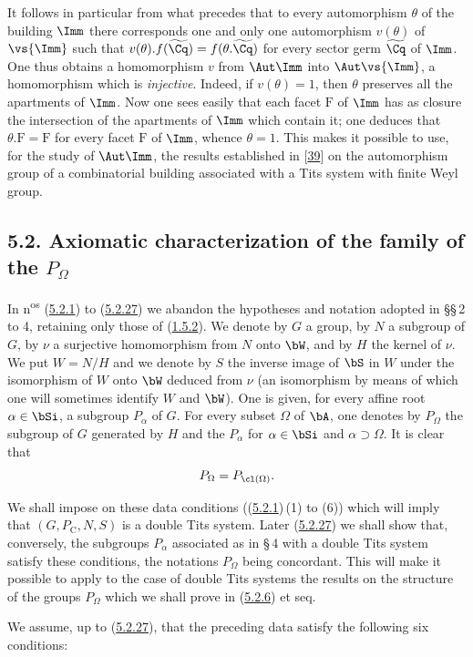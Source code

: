 \documentclass[12pt,a4paper,oneside,english]{smfart}
\makeatletter
\newcommand{\btanchor}[1]{\leavevmode\Hy@raisedlink{\hypertarget{bt:#1}{}}}
\newcommand{\btpageanchor}[1]{\Hy@raisedlink{\hypertarget{p:#1}{}}}
\newcommand{\btref}[1]{\hyperlink{bt:#1}{#1}}
\newcommand{\btbib}[1]{\hyperlink{bib:#1}{#1}}
\newcommand{\btpage}[1]{\marginnote{p.~#1}\btpageanchor{#1}}
\newcommand{\pg}[1]{\btpage{#1}}
\newcommand{\btsecB}[2]{%
  \par\needspace{4\baselineskip}\phantomsection
  \subsection*{#2}%
  \ifx\relax#1\relax\else\btanchor{#1}\fi}
\theoremstyle{definition}
\theoremstyle{bt}
\makeatother
\begin{document}
It follows in particular from what precedes that to every automorphism $\theta$
of the building $\Imm$ there corresponds one and only one automorphism
$v(\theta)$ of $\vs{\Imm}$ such that
$v(\theta).f(\widetilde{\Cq})=f(\theta.\widetilde{\Cq})$ for every sector germ
$\widetilde{\Cq}$ of $\Imm$. One thus obtains a homomorphism $v$ from
$\Aut\Imm$ into $\Aut\vs{\Imm}$, a homomorphism which is \emph{injective}.
Indeed, if $v(\theta)=1$, then $\theta$ preserves all the apartments of $\Imm$.
Now one sees easily that each facet $\mathrm{F}$ of $\Imm$ has as closure the
intersection of the apartments of $\Imm$ which contain it; one deduces that
$\theta.\mathrm{F}=\mathrm{F}$ for every facet $\mathrm{F}$ of $\Imm$, whence
$\theta=1$. This makes it possible to use, for the study of $\Aut\Imm$, the
results established in [\btbib{39}] on the automorphism group of a combinatorial
building associated with a Tits system with finite Weyl group.

\btsecB{5.2}{5.2. Axiomatic characterization of the family of the \texorpdfstring{$P_{\Omega}$}{P\_Omega}}

In n\textsuperscript{os} (\btref{5.2.1}) to (\btref{5.2.27}) we abandon the hypotheses and
notation adopted in \S\S\,2 to 4, retaining only those of (\btref{1.5.2}). We denote by
$G$ a group, by $N$ a subgroup of $G$, by $\nu$ a surjective homomorphism from
$N$ onto $\bW$, and by $H$ the kernel of $\nu$. We put $W=N/H$ and we denote by
$S$ the inverse image of $\bS$ in $W$ under the isomorphism of $W$ onto $\bW$
deduced from $\nu$ (an isomorphism by means of which one will \pg{97}sometimes
identify $W$ and $\bW$). One is given, for every affine root $\alpha\in\bSi$, a
subgroup $P_{\alpha}$ of $G$. For every subset $\Omega$ of $\bA$, one denotes by
$P_{\Omega}$ the subgroup of $G$ generated by $H$ and the $P_{\alpha}$ for
$\alpha\in\bSi$ and $\alpha\supset\Omega$. It is clear that
\[
P_{\Omega}=P_{\cl(\Omega)}.
\]

We shall impose on these data conditions ((\btref{5.2.1})\,(1) to (6)) which will imply
that $(G,P_{\mathrm{C}},N,S)$ is a double Tits system. Later (\btref{5.2.27}) we shall
show that, conversely, the subgroups $P_{\alpha}$ associated as in \S\,4 with a
double Tits system satisfy these conditions, the notations $P_{\Omega}$ being
concordant. This will make it possible to apply to the case of double Tits
systems the results on the structure of the groups $P_{\Omega}$ which we shall
prove in (\btref{5.2.6}) et seq.

\btanchor{5.2.1}
We assume, up to (\btref{5.2.27}), that the preceding data satisfy the following six
conditions:
\end{document}
